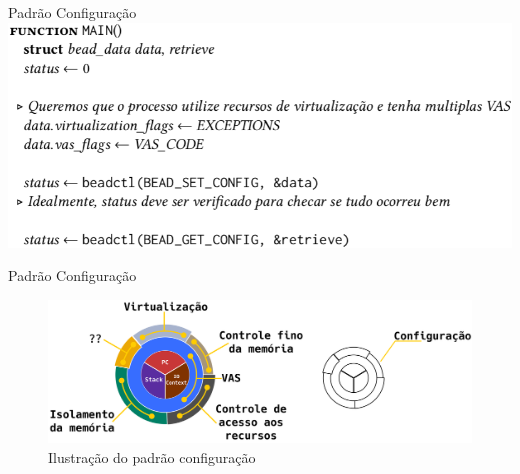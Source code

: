 \documentclass[xcolor={usenames,svgnames,dvipsnames},brazil,english,12pt,aspectratio=149]{beamer}
\begin{document}
\begin{frame}{Padrão Configuração}
  \centering
  \includegraphics[width=\textwidth]{padraoConfig}
\end{frame}

\begin{frame}{Padrão Configuração}
  \begin{figure}[!h]
    \centering
    \includegraphics[width=\textwidth]{decomposition_conf}
    \caption*{Ilustração do padrão configuração}
  \end{figure}
\end{frame}
\end{document}
